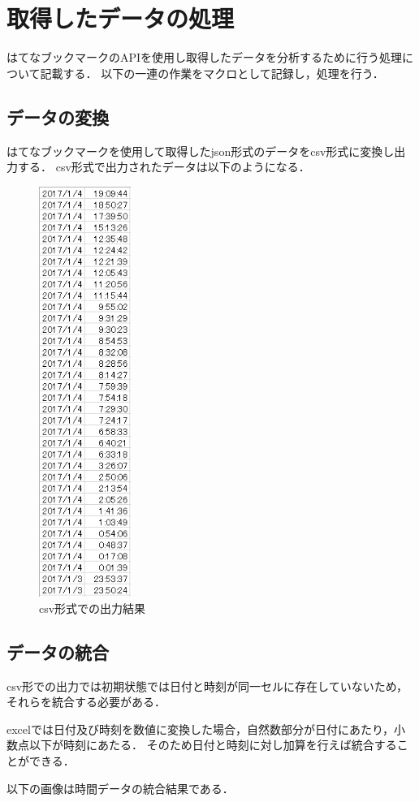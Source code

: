 \newpage

\section{取得したデータの処理}
はてなブックマークのAPIを使用し取得したデータを分析するために行う処理について記載する．
以下の一連の作業をマクロとして記録し，処理を行う．

\subsection{データの変換}
はてなブックマークを使用して取得したjson形式のデータをcsv形式に変換し出力する．
csv形式で出力されたデータは以下のようになる．

\begin{figure}[htb]
\centering
\includegraphics[width=3cm]{excel1.PNG}
\caption{csv形式での出力結果}\label{excel1}
\end{figure}

\newpage

\subsection{データの統合}
csv形での出力では初期状態では日付と時刻が同一セルに存在していないため，それらを統合する必要がある．\par
excelでは日付及び時刻を数値に変換した場合，自然数部分が日付にあたり，小数点以下が時刻にあたる．
そのため日付と時刻に対し加算を行えば統合することができる．\par
以下の画像は時間データの統合結果である．

